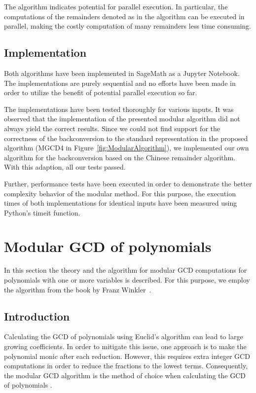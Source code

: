 The algorithm indicates potential for parallel execution. In particular, the computations of the remainders denoted as  in the algorithm can be executed in parallel, making the costly computation of many remainders less time consuming.

\subsection{Implementation}

Both algorithms have been implemented in SageMath as a Jupyter Notebook. The implementations are purely sequential and no efforts have been made in order to utilize the benefit of potential parallel execution so far.

The implementations have been tested thoroughly for various inputs. It was observed that the implementation of the presented modular algorithm did not always yield the correct results. Since we could not find support for the correctness of the backconversion to the standard representation in the proposed algorithm (MGCD4 in Figure~\ref{fig:ModularAlgorithm}), we implemented our own algorithm for the backconversion based on the Chinese remainder algorithm. With this adaption, all our tests passed.

Further, performance tests have been executed in order to demonstrate the better complexity behavior of the modular method. For this purpose, the execution times of both implementations for identical inputs have been measured using Python's timeit function.

\section{Modular GCD of polynomials}\label{Modular GCD of polynomials}

In this section the theory and the algorithm for modular GCD computations for polynomials with one or more variables is described. For this purpose, we employ the algorithm from the book by Franz Winkler~\cite{winkler1996}.

\subsection{Introduction}

Calculating the GCD of polynomials using Euclid's algorithm can lead to large growing coefficients. In order to mitigate this issue, one approach is to make the polynomial monic after each reduction. However, this requires extra integer GCD computations in order to reduce the fractions to the lowest terms. Consequently, the modular GCD algorithm is the method of choice when calculating the GCD of polynomials \cite{modernComputerAlgebra}.

